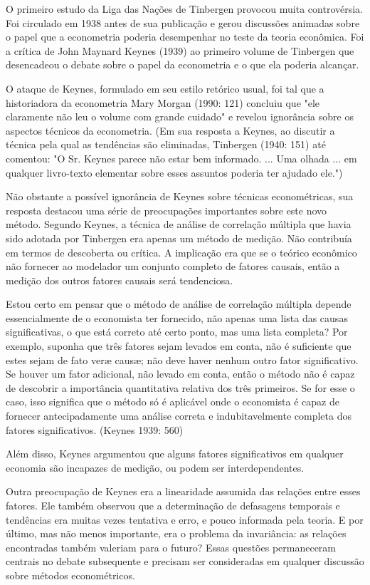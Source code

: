 \documentclass[12pt]{article}
\begin{document}
O primeiro estudo da Liga das Nações de Tinbergen provocou muita controvérsia.
Foi circulado em 1938 antes de sua publicação e gerou
discussões animadas sobre o papel que a econometria poderia desempenhar no teste
da teoria econômica. Foi a crítica de John Maynard Keynes (1939)
ao primeiro volume de Tinbergen que desencadeou o debate sobre o papel da
econometria e o que ela poderia alcançar.

O ataque de Keynes, formulado em seu estilo retórico usual, foi tal que
a historiadora da econometria Mary Morgan (1990: 121) concluiu que
"ele claramente não leu o volume com grande cuidado" e revelou
ignorância sobre os aspectos técnicos da econometria. (Em sua resposta a
Keynes, ao discutir a técnica pela qual as tendências são eliminadas,
Tinbergen (1940: 151) até comentou: "O Sr. Keynes parece não estar
bem informado. ... Uma olhada ... em qualquer livro-texto elementar sobre esses assuntos
poderia ter ajudado ele.")

Não obstante a possível ignorância de Keynes sobre técnicas econométricas,
sua resposta destacou uma série de preocupações importantes sobre
este novo método. Segundo Keynes, a técnica de análise de correlação múltipla que havia sido adotada por Tinbergen era apenas um método
de medição. Não contribuía em termos de descoberta ou
crítica. A implicação era que se o teórico econômico não fornecer
ao modelador um conjunto completo de fatores causais, então a medição
dos outros fatores causais será tendenciosa.

Estou certo em pensar que o método de análise de correlação múltipla
depende essencialmente de o economista ter fornecido, não apenas
uma lista das causas significativas, o que está correto até certo ponto, mas
uma lista completa? Por exemplo, suponha que três fatores sejam levados em
conta, não é suficiente que estes sejam de fato veræ causæ;
não deve haver nenhum outro fator significativo. Se houver um fator adicional,
não levado em conta, então o método não é capaz de descobrir a importância
quantitativa relativa dos três primeiros. Se for esse o caso, isso significa que
o método só é aplicável onde o economista é capaz de fornecer
antecipadamente uma análise correta e indubitavelmente completa dos fatores
significativos.
(Keynes 1939: 560)

Além disso, Keynes argumentou que alguns fatores significativos em qualquer economia são
incapazes de medição, ou podem ser interdependentes.

Outra preocupação de Keynes era a linearidade assumida das relações
entre esses fatores. Ele também observou que a determinação de defasagens temporais
e tendências era muitas vezes tentativa e erro, e pouco informada pela teoria.
E por último, mas não menos importante, era o problema da invariância: as relações
encontradas também valeriam para o futuro? Essas questões permaneceram centrais
no debate subsequente e precisam ser consideradas em qualquer discussão sobre
métodos econométricos.
\end{document}
